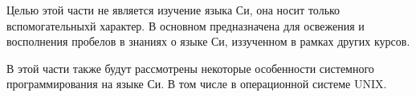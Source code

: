 Целью этой части не является изучение языка Си, она носит только вспомогательныхй характер. В основном предназначена для освежения и восполнения пробелов в знаниях о языке Си, иззученном в рамках других курсов.

В этой части также будут рассмотрены некоторые особенности системного программирования на языке Си. В том числе в операционной системе UNIX.